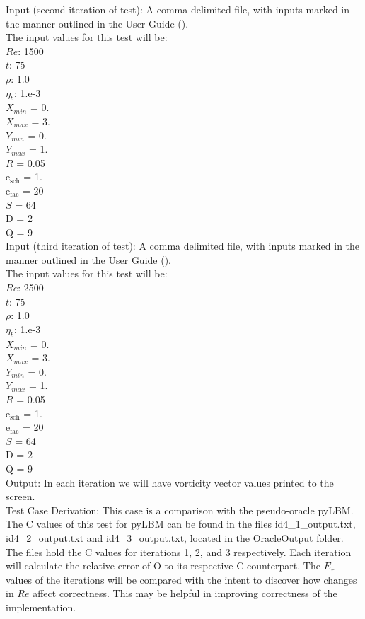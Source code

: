 \documentclass[12pt, titlepage]{article}
\begin{document}
\begin{enumerate}
Input (second iteration of test): A comma delimited file, with inputs marked in the manner outlined in the User Guide (\citet{LBM_UserGuide_PM}).\\The input values for this test will be:\\
$Re$: 1500\\
$t$: 75\\
$\rho$: 1.0\\
$\eta_b$: 1.e-3\\
$X_{min}$ = 0.\\
$X_{max}$ = 3.\\
$Y_{min}$ = 0.\\
$Y_{max}$ = 1.\\
$R$ = 0.05\\
$\mathrm{e_{sch}}$ = 1.\\
$\mathrm{e_{fac}}$ = 20\\
$S$ = 64\\
$\mathrm{D}$ = 2\\
$\mathrm{Q}$ = 9\\

Input (third iteration of test): A comma delimited file, with inputs marked in the manner outlined in the User Guide (\citet{LBM_UserGuide_PM}).\\The input values for this test will be:\\
$Re$: 2500\\
$t$: 75\\
$\rho$: 1.0\\
$\eta_b$: 1.e-3\\
$X_{min}$ = 0.\\
$X_{max}$ = 3.\\
$Y_{min}$ = 0.\\
$Y_{max}$ = 1.\\
$R$ = 0.05\\
$\mathrm{e_{sch}}$ = 1.\\
$\mathrm{e_{fac}}$ = 20\\
$S$ = 64\\
$\mathrm{D}$ = 2\\
$\mathrm{Q}$ = 9\\

		
Output: In each iteration we will have vorticity vector values printed to the screen.\\

Test Case Derivation: This case is a comparison with the pseudo-oracle pyLBM. The C values of this test for pyLBM can be found in the files id4\_1\_output.txt, id4\_2\_output.txt and id4\_3\_output.txt, located in the OracleOutput folder. The files hold the C values for iterations 1, 2, and 3 respectively. Each iteration will calculate the relative error of O to its respective C counterpart. The $E_r$ values of the iterations will be compared with the intent to discover how changes in $Re$ affect correctness. This may be helpful in improving correctness of the implementation.\\	


\end{enumerate}
\end{document}
